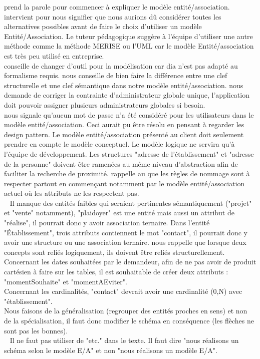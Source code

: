 \documentclass [a4paper] {article}
\begin{document}
\Julie{} prend la parole pour commencer à expliquer le modèle entité/association.
\nomTuteurPedago{} intervient pour nous signifier que nous aurions dû considérer toutes les alternatives possibles avant de  faire le choix d'utiliser un modèle Entité/Association. Le tuteur pédagogique suggère à l'équipe d'utiliser une autre méthode comme la méthode MERISE ou l'UML car le modèle Entité/association est très peu utilisé en entreprise. \\
\nomTuteurPedago{} conseille de changer d'outil pour la modélisation car dia n'est pas adapté au formalisme requis. \nomTuteurPedago{} nous conseille de bien faire la différence entre une clef structurelle et une clef sémantique dans notre modèle entité/association.
\nomTuteurPedago{} nous demande de corriger la contrainte d'administrateur globale unique, l'application doit pouvoir assigner plusieurs administrateurs globales si besoin. \\
\nomTuteurPedago{} nous signale qu'aucun mot de passe n'a été considéré pour les utilisateurs dans le modèle entité/association. Ceci aurait pu être résolu en pensant à regarder les design pattern. 
Le modèle entité/association présenté au client doit seulement prendre en compte le modèle conceptuel. Le modèle logique ne servira qu'à l'équipe de développement. 
Les structures "adresse de l'établissement" et "adresse de la personne" doivent être ramenées au même niveau d'abstraction afin de faciliter la recherche de proximité.
\nomTuteurPedago{} rappelle au \RGC{} que les règles de nommage sont à respecter partout en commençant notamment par le modèle entité/association actuel où les attributs ne les respectent pas.
\\ ~
Il manque des entités faibles qui seraient pertinentes sémantiquement ("projet" et "vente" notamment), "plaidoyer" est une entité mais aussi un attribut de "réalise", il pourrait donc y avoir association ternaire. Dans l'entité "Établissement", trois attributs contiennent le mot "contact", il pourrait donc y avoir une structure ou une association ternaire. \nomTuteurPedago{} nous rappelle que lorsque deux concepts sont reliés logiquement, ils doivent être reliés structurellement. Concernant les dates souhaitées par le demandeur, afin de ne pas avoir de produit cartésien à faire sur les tables, il est souhaitable de créer deux attributs : "momentSouhaite" et "momentAEviter".
\\
Concernant les cardinalités, "contact" devrait avoir une cardinalité (0,N) avec "établissement".
\\
Nous faisons de la généralisation (regrouper des entités proches en sens) et non de la spécialisation, il faut donc modifier le schéma en conséquence (les flèches ne sont pas les bonnes).
\\ ~
Il ne faut pas utiliser de "etc." dans le texte. Il faut dire "nous réalisons un schéma selon le modèle E/A" et non "nous réalisons un modèle E/A".
\end{document}
